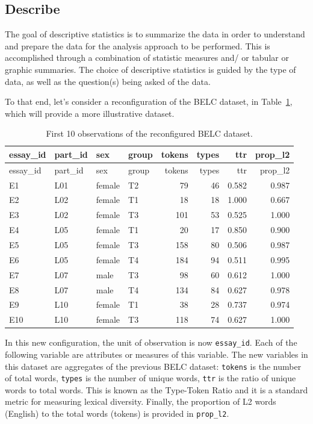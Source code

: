 \documentclass[
  letterpaper,
  DIV=11,
  numbers=noendperiod]{scrreport}
\theoremstyle{definition}
\theoremstyle{remark}
\begin{document}
\hypertarget{sec-aa-describe}{%
\subsection{Describe}\label{sec-aa-describe}}

The goal of descriptive statistics is to summarize the data in order to
understand and prepare the data for the analysis approach to be
performed. This is accomplished through a combination of statistic
measures and/ or tabular or graphic summaries. The choice of descriptive
statistics is guided by the type of data, as well as the question(s)
being asked of the data.

To that end, let's consider a reconfiguration of the BELC dataset, in
Table~\ref{tbl-aa-belc-reconfig}, which will provide a more illustrative
dataset.

\hypertarget{tbl-aa-belc-reconfig}{}
\begin{longtable}[]{@{}llllrrrr@{}}
\caption{\label{tbl-aa-belc-reconfig}First 10 observations of the
reconfigured BELC dataset.}\tabularnewline
\toprule\noalign{}
essay\_id & part\_id & sex & group & tokens & types & ttr & prop\_l2 \\
\midrule\noalign{}
\endfirsthead
\toprule\noalign{}
essay\_id & part\_id & sex & group & tokens & types & ttr & prop\_l2 \\
\midrule\noalign{}
\endhead
\bottomrule\noalign{}
\endlastfoot
E1 & L01 & female & T2 & 79 & 46 & 0.582 & 0.987 \\
E2 & L02 & female & T1 & 18 & 18 & 1.000 & 0.667 \\
E3 & L02 & female & T3 & 101 & 53 & 0.525 & 1.000 \\
E4 & L05 & female & T1 & 20 & 17 & 0.850 & 0.900 \\
E5 & L05 & female & T3 & 158 & 80 & 0.506 & 0.987 \\
E6 & L05 & female & T4 & 184 & 94 & 0.511 & 0.995 \\
E7 & L07 & male & T3 & 98 & 60 & 0.612 & 1.000 \\
E8 & L07 & male & T4 & 134 & 84 & 0.627 & 0.978 \\
E9 & L10 & female & T1 & 38 & 28 & 0.737 & 0.974 \\
E10 & L10 & female & T3 & 118 & 74 & 0.627 & 1.000 \\
\end{longtable}

In this new configuration, the unit of observation is now
\texttt{essay\_id}. Each of the following variable are attributes or
measures of this variable. The new variables in this dataset are
aggregates of the previous BELC dataset: \texttt{tokens} is the number
of total words, \texttt{types} is the number of unique words,
\texttt{ttr} is the ratio of unique words to total words. This is known
as the Type-Token Ratio and it is a standard metric for measuring
lexical diversity. Finally, the proportion of L2 words (English) to the
total words (tokens) is provided in \texttt{prop\_l2}.
\end{document}
